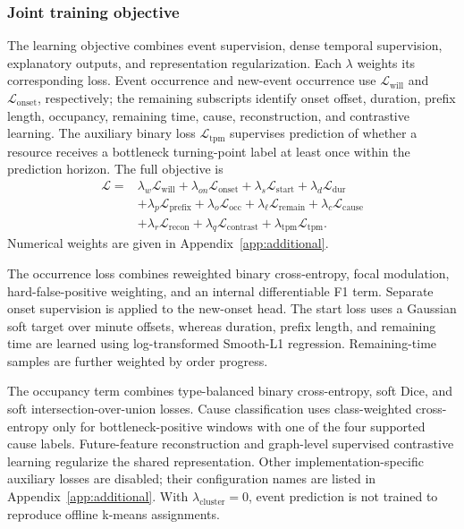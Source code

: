 \documentclass[a4paper,fleqn]{cas-dc}
\begin{document}
\subsubsection{Joint training objective}\label{sec:joint-optimization}

The learning objective combines event supervision, dense temporal supervision, explanatory outputs, and representation regularization. Each $\lambda$ weights its corresponding loss. Event occurrence and new-event occurrence use $\mathcal{L}_{\mathrm{will}}$ and $\mathcal{L}_{\mathrm{onset}}$, respectively; the remaining subscripts identify onset offset, duration, prefix length, occupancy, remaining time, cause, reconstruction, and contrastive learning. The auxiliary binary loss $\mathcal{L}_{\mathrm{tpm}}$ supervises prediction of whether a resource receives a bottleneck turning-point label at least once within the prediction horizon. The full objective is
\begin{equation}
\begin{aligned}
\mathcal{L}={}&
\lambda_w\mathcal{L}_{\mathrm{will}}+
\lambda_{on}\mathcal{L}_{\mathrm{onset}}+
\lambda_s\mathcal{L}_{\mathrm{start}}+
\lambda_d\mathcal{L}_{\mathrm{dur}}\\
&+\lambda_p\mathcal{L}_{\mathrm{prefix}}+
\lambda_o\mathcal{L}_{\mathrm{occ}}+
\lambda_{\ell}\mathcal{L}_{\mathrm{remain}}+
\lambda_c\mathcal{L}_{\mathrm{cause}}\\
&+\lambda_r\mathcal{L}_{\mathrm{recon}}+
\lambda_q\mathcal{L}_{\mathrm{contrast}}+
\lambda_{\mathrm{tpm}}\mathcal{L}_{\mathrm{tpm}} .
\end{aligned}
\end{equation}
Numerical weights are given in Appendix~\ref{app:additional}.

The occurrence loss combines reweighted binary cross-entropy, focal modulation, hard-false-positive weighting, and an internal differentiable F1 term. Separate onset supervision is applied to the new-onset head. The start loss uses a Gaussian soft target over minute offsets, whereas duration, prefix length, and remaining time are learned using log-transformed Smooth-L1 regression. Remaining-time samples are further weighted by order progress.

The occupancy term combines type-balanced binary cross-entropy, soft Dice, and soft intersection-over-union losses. Cause classification uses class-weighted cross-entropy only for bottleneck-positive windows with one of the four supported cause labels. Future-feature reconstruction and graph-level supervised contrastive learning regularize the shared representation. Other implementation-specific auxiliary losses are disabled; their configuration names are listed in Appendix~\ref{app:additional}. With $\lambda_{\mathrm{cluster}}=0$, event prediction is not trained to reproduce offline k-means assignments.
\end{document}
